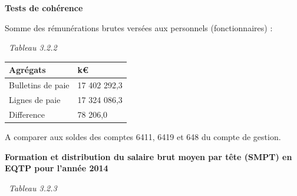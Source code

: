 \textbf{Tests de cohérence}

Somme des rémunérations brutes versées aux personnels (fonctionnaires) :

~\emph{Tableau 3.2.2}

\begin{longtable}[]{@{}ll@{}}
\toprule
Agrégats & k€\tabularnewline
\midrule
\endhead
Bulletins de paie & 17 402 292,3\tabularnewline
Lignes de paie & 17 324 086,3\tabularnewline
Difference & 78 206,0\tabularnewline
\bottomrule
\end{longtable}

A comparer aux soldes des comptes 6411, 6419 et 648 du compte de
gestion.

\textbf{Formation et distribution du salaire brut moyen par tête (SMPT)
en EQTP pour l'année 2014 }

~\emph{Tableau 3.2.3}

